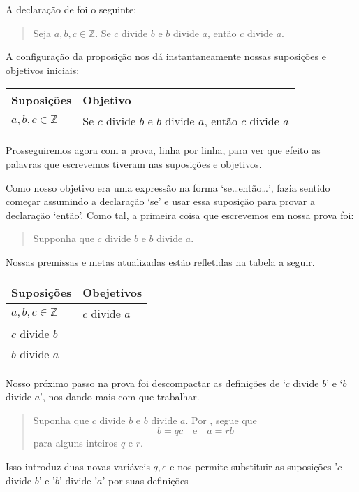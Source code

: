 \begin{example}
\label{exAssumptionsGoals}
A declaração de  foi o seguinte:
\begin{quote}
Seja $a,b,c \in \mathbb{Z}$. Se $c$ divide $b$ e $b$ divide $a$, então $c$ divide $a$.
\end{quote}
A configuração da proposição nos dá instantaneamente nossas suposições e objetivos iniciais:
\begin{center}
\begin{tabular}{C{150pt}|C{150pt}}
\textbf{Suposições} & \textbf{Objetivo} \\ \hline
$a,b,c \in \mathbb{Z}$ & Se $c$ divide $b$ e $b$ divide $a$, então $c$ divide $a$
\end{tabular}
\end{center}
Prosseguiremos agora com a prova, linha por linha, para ver que efeito as palavras que escrevemos tiveram nas suposições e objetivos.

Como nosso objetivo era uma expressão na forma `se\dots{}então\dots{}', fazia sentido começar assumindo a declaração `se' e usar essa suposição para provar a declaração `então'. Como tal, a primeira coisa que escrevemos em nossa prova foi:
\begin{quote}
Supponha que $c$ divide $b$ e $b$ divide $a$.
\end{quote}
Nossas premissas e metas atualizadas estão refletidas na tabela a seguir.
\begin{center}
\begin{tabular}{C{150pt}|C{150pt}}
\textbf{Suposições} & \textbf{Obejetivos} \\ \hline
$a,b,c \in \mathbb{Z}$ & $c$ divide $a$ \\
$c$ divide $b$ & \\
$b$ divide $a$ & 
\end{tabular}
\end{center}

Nosso próximo passo na prova foi descompactar as definições de `$c$ divide $b$' e `$b$ divide $a$', nos dando mais com que trabalhar.

\begin{quote}
{\color{gray} Suponha que $c$ divide $b$ e $b$ divide $a$.} Por , segue que
\[
b=qc \quad \text{e} \quad a=rb
\]
para alguns inteiros $q$ e $r$.
\end{quote}

Isso introduz duas novas variáveis $q,e$ e nos permite substituir as suposições '$c$ divide $b$' e '$b$' divide '$a$' por suas definições


\end{example}
